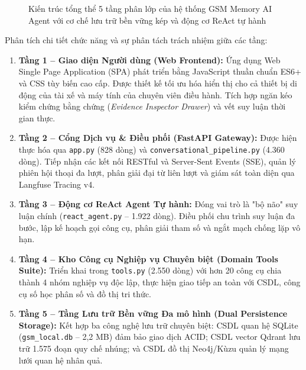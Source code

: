 \documentclass[a4paper,11pt]{article}
\begin{document}
\begin{figure}[htbp]
{}
\caption{Kiến trúc tổng thể 5 tầng phân lớp của hệ thống GSM Memory AI Agent với cơ chế lưu trữ bền vững kép và động cơ ReAct tự hành}
\label{fig:sprint2-architecture}
\end{figure}

Phân tích chi tiết chức năng và sự phân tách trách nhiệm giữa các tầng:
\begin{enumerate}[leftmargin=1.8em,topsep=2pt]
    \item \textbf{Tầng 1 -- Giao diện Người dùng (Web Frontend):} Ứng dụng Web Single Page Application (SPA) phát triển bằng JavaScript thuần chuẩn ES6+ và CSS tùy biến cao cấp. Được thiết kế tối ưu hóa hiển thị cho cả thiết bị di động của tài xế và máy tính của chuyên viên điều hành. Tích hợp ngăn kéo kiểm chứng bằng chứng (\textit{Evidence Inspector Drawer}) và vết suy luận thời gian thực.
    \item \textbf{Tầng 2 -- Cổng Dịch vụ \& Điều phối (FastAPI Gateway):} Được hiện thực hóa qua \nolinkurl{app.py} (828 dòng) và \nolinkurl{conversational_pipeline.py} (4.360 dòng). Tiếp nhận các kết nối RESTful và Server-Sent Events (SSE), quản lý phiên hội thoại đa lượt, phân giải đại từ liên lượt và giám sát toàn diện qua Langfuse Tracing v4.
    \item \textbf{Tầng 3 -- Động cơ ReAct Agent Tự hành:} Đóng vai trò là "bộ não" suy luận chính (\nolinkurl{react_agent.py} -- 1.922 dòng). Điều phối chu trình suy luận đa bước, lập kế hoạch gọi công cụ, phân giải tham số và ngắt mạch chống lặp vô hạn.
    \item \textbf{Tầng 4 -- Kho Công cụ Nghiệp vụ Chuyên biệt (Domain Tools Suite):} Triển khai trong \nolinkurl{tools.py} (2.550 dòng) với hơn 20 công cụ chia thành 4 nhóm nghiệp vụ độc lập, thực hiện giao tiếp an toàn với CSDL, công cụ số học phân số và đồ thị tri thức.
    \item \textbf{Tầng 5 -- Tầng Lưu trữ Bền vững Đa mô hình (Dual Persistence Storage):} Kết hợp ba công nghệ lưu trữ chuyên biệt: CSDL quan hệ SQLite (\nolinkurl{gsm_local.db} -- 2,2 MB) đảm bảo giao dịch ACID; CSDL vector Qdrant lưu trữ 1.575 đoạn quy chế nhúng; và CSDL đồ thị Neo4j/Kùzu quản lý mạng lưới quan hệ nhân quả.
\end{enumerate}
\end{document}
